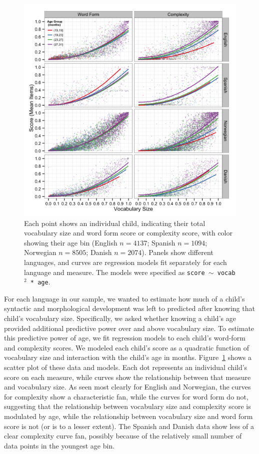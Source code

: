 \documentclass[10pt,letterpaper]{article}
\begin{document}
\begin{figure}[tb]
\begin{center}
\includegraphics[width=.9\textwidth]{plots/grammar.png}
\end{center}
\caption{\label{fig:grammar} Each point shows an individual child, indicating their total vocabulary size and word form score or complexity score, with color showing their age bin (English $n=4137$; Spanish $n=1094$; Norwegian $n=8505$; Danish $n=2074$). Panels show different languages, and curves are regression models fit separately for each language and measure. The models were specified as \small{\tt{score $\sim$ vocab$^{2}$ * age}}.} 
\end{figure}

For each language in our sample, we wanted to estimate how much of a child's syntactic and morphological development was left to predicted after knowing that child's vocabulary size. Specifically, we asked whether knowing a child's age provided additional predictive power over and above vocabulary size. To estimate this predictive power of age, we fit regression models to each child's word-form and complexity scores. We modeled each child's score as a quadratic function of vocabulary size and interaction with the child's age in months. Figure~\ref{fig:grammar} shows a scatter plot of these data and models. Each dot represents an individual child's score on each measure, while curves show the relationship between that measure and vocabulary size. As seen most clearly for English and Norwegian, the curves for complexity show a characteristic fan, while the curves for word form do not, suggesting that the relationship between vocabulary size and complexity score is modulated by age, while the relationship between vocabulary size and word form score is not (or is to a lesser extent). The Spanish and Danish data show less of a clear complexity curve fan, possibly because of the relatively small number of data points in the youngest age bin.
\end{document}

